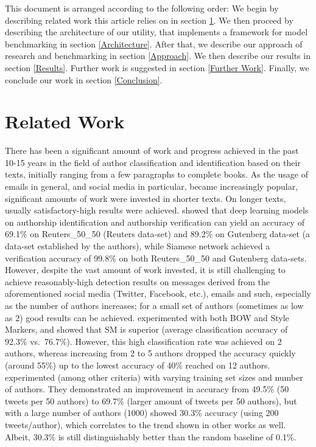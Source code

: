 \documentclass[a4paper]{article}
\begin{document}
This document is arranged according to the following order:
We begin by describing related work this article relies on in section \ref{Related Work}.
We then proceed by describing the architecture of our utility, that implements a framework for model benchmarking in section \ref{Architecture}.
After that, we describe our approach of research and benchmarking in section \ref{Approach}.
We then describe our results in section \ref{Results}.
Further work is suggested in section \ref{Further Work}.
Finally, we conclude our work in section \ref{Conclusion}.
\section{Related Work}
\label{Related Work}

There has been a significant amount of work and progress achieved in the past 10-15 years in the field of author classification and identification based on their texts, initially ranging from a few paragraphs to complete books. As the usage of emails in general, and social media in particular, became increasingly popular, significant amounts of work were invested in shorter texts.
On longer texts, usually satisfactory-high results were achieved. \citep{qian} showed that deep learning models on authorship identification and authorship verification can yield an accuracy of 69.1\% on Reuters\_50\_50 (Reuters data-set) and 89.2\% on Gutenberg data-set (a data-set established by the authors), while Siamese network achieved a verification accuracy of 99.8\% on both Reuters\_50\_50 and Gutenberg data-sets.\\
However, despite the vast amount of work invested, it is still challenging to achieve reasonably-high detection results on messages derived from the aforementioned social media (Twitter, Facebook, etc.), emails and such, especially as the number of authors increases; for a small set of authors (sometimes as low as 2) good results can be achieved. \citep{green} experimented with both BOW and Style Markers, and showed that SM is superior (average classification accuracy of 92.3\% vs.\ 76.7\%). However, this high classification rate was achieved on 2 authors, whereas increasing from 2 to 5 authors dropped the accuracy quickly (around 55\%) up to the lowest accuracy of 40\% reached on 12 authors.
\citep{schwartz} experimented (among other criteria) with varying training set sizes and number of authors. They demonstrated an improvement in accuracy from 49.5\% (50 tweets per 50 authors) to 69.7\% (larger amount of tweets per 50 authors), but with a large number of authors (1000) showed 30.3\% accuracy (using 200 tweets/author), which correlates to the trend shown in other works as well. Albeit, 30.3\% is still  distinguishably better than the random baseline of 0.1\%.
\end{document}
